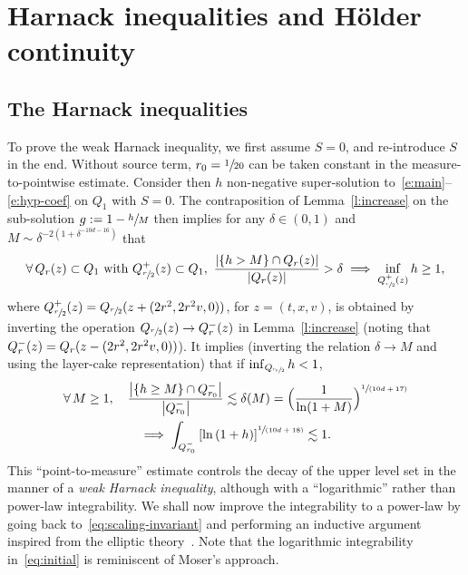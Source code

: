 \documentclass[11pt]{article}
\numberwithin{equation}{section}\let\oldbigcup\bigcup
\newcommand{\spfrac}[2]{\sfrac{#1}{(#2)}}
\theoremstyle{definition}
\theoremstyle{remark}
\begin{document}
\section{Harnack inequalities and Hölder continuity}
\label{sec:Harnack}

\subsection{The Harnack inequalities}

To prove the weak Harnack inequality, we first assume $S=0$, and
re-introduce $S$ in the end. Without source term,
$r_0=\sfrac{1}{20}$ can be taken constant in the
measure-to-pointwise estimate. Consider then $h$ non-negative
super-solution to~\eqref{e:main}--\eqref{e:hyp-coef} on $Q_1$ with
$S=0$. The contraposition of Lemma~\ref{l:increase} on the
sub-solution $g := 1 - \sfrac{h}{M}$ then implies for any
$\delta \in (0,1)$ and $M \sim \delta^{-2 (1+\delta^{-10d-16})}$
that
\begin{equation}
\label{eq:scaling-invariant}
\forall \, Q_r(z) \subset Q_1 \text{ with }
Q_{\sfrac{r}{2}}^{+}(z) \subset Q_1, \
\frac{\left| \{ h > M \} \cap Q_{r}(z) \right|}{\left|
Q_{r}(z) \right|} > \delta \implies \inf_{Q_{\sfrac{r}{2}}^+(z)} h \ge 1,
\end{equation}
where
$Q_{\sfrac{r}{2}}^{+}(z) = Q_{\sfrac{r}{2}}(z +(2r^2,2r^2v,0))$,
for $z=(t,x,v)$, is obtained by inverting the operation
$Q_{\sfrac{r}{2}}(z) \to Q_{r}^-(z)$ in Lemma~\ref{l:increase}
(noting that $Q_r^-(z)=Q_r(z-\nobreak(2r^2,2r^2v,0))$). It implies
(inverting the relation $\delta \to M$ and using the layer-cake
representation) that if $\inf_{Q_{\sfrac{r_0}{2}}} h <1$,
\begin{multline}
\label{eq:initial}
\forall \, M \ge 1, \quad \frac{\left| \{ h \ge M \} \cap
Q_{r_0}^- \right|}{\left|Q_{r_0}^- \right|} \lesssim
\delta(M) =\Bigl( \frac{1}{ \ln (1+M)}
\Bigr)^{\spfrac{1}{10d+17}} \\
\implies
\int_{Q_{r_0}^- } \left[ \ln \left( 1+ h \right)
\right]^{\spfrac{1}{10d+18}} \lesssim 1.
\end{multline}
This ``point-to-measure'' estimate controls the decay of the
upper level set in the manner of a \emph{weak Harnack
inequality}, although with a ``logarithmic'' rather than
power-law integrability. We shall now improve the integrability
to a power-law by going back to~\eqref{eq:scaling-invariant} and
performing an inductive argument inspired from the elliptic
theory~\cite{MR3565366}. Note that the logarithmic integrability
in~\eqref{eq:initial} is reminiscent of Moser's approach.
\end{document}
